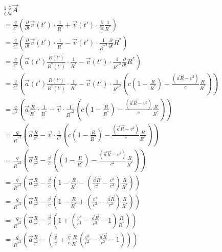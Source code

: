 \documentclass[11pt]{article}
\begin{document}
\(\begin{array}{l}\frac{1}{c}\frac{\partial }{\partial t}\overrightarrow{A} \\  = \frac{q}{c^2}\left(\frac{\partial }{\partial t}\overrightarrow{v}\left(t'\right) \cdot \frac{1}{{{R}^{*}}} + \overrightarrow{v}\left(t'\right) \cdot \frac{\partial }{\partial t}\frac{1}{{{R}^{*}}}\right) \\  = \frac{q}{c^2}\left(\frac{\partial }{\partial t}\overrightarrow{v}\left(t'\right) \cdot \frac{1}{{{R}^{*}}} - \overrightarrow{v}\left(t'\right) \cdot \frac{1}{{{R}^{*}}^2}\frac{\partial }{\partial t} {{R}^{*}}\right) \\  = \frac{q}{c^2}\left(\vec a\left(t'\right) \frac{R\left(t'\right)}{{{R}^{*}}\left(t'\right)} \cdot \frac{1}{{{R}^{*}}} - \overrightarrow{v}\left(t'\right) \cdot \frac{1}{{{R}^{*}}^2}\frac{\partial }{\partial t} {{R}^{*}}\right) \\  = \frac{q}{c^2}\left(\vec a\left(t'\right) \frac{R\left(t'\right)}{{{R}^{*}}\left(t'\right)} \cdot \frac{1}{{{R}^{*}}} - \overrightarrow{v}\left(t'\right) \cdot \frac{1}{{{R}^{*}}^2}\left( c \left(1 - \frac{R}{{{R}^{*}}}\right)-\frac{\left(\vec a \vec R - v^2 \right)}{c}\frac{R}{{{R}^{*}}} \right)\right) \\  = \frac{q}{c^2}\left(\vec a \frac{R}{{{R}^{*}}} \cdot \frac{1}{{{R}^{*}}} - \overrightarrow{v} \cdot \frac{1}{{{R}^{*}}^2}\left( c \left(1 - \frac{R}{{{R}^{*}}}\right)-\frac{\left(\vec a \vec R - v^2 \right)}{c}\frac{R}{{{R}^{*}}} \right)\right) \\  = \frac{q}{{{R}^{*}}^2}\left(\vec a \frac{R}{c^2} - \overrightarrow{v} \cdot \frac{1}{c^2}\left( c \left(1 - \frac{R}{{{R}^{*}}}\right)-\frac{\left(\vec a \vec R - v^2 \right)}{c}\frac{R}{{{R}^{*}}} \right)\right) \\  = \frac{q}{{{R}^{*}}^2}\left(\vec a \frac{R}{c^2} - \frac{\overrightarrow{v}}{c}\left( \left(1 - \frac{R}{{{R}^{*}}}\right)-\frac{\left(\vec a \vec R - v^2 \right)}{c^2}\frac{R}{{{R}^{*}}} \right)\right) \\  = \frac{q}{{{R}^{*}}^2}\left(\vec a \frac{R}{c^2} - \frac{\overrightarrow{v}}{c}\left( 1 - \frac{R}{{{R}^{*}}}-\left(\frac{\vec a \vec R}{c^2} - \frac{v^2}{c^2} \right)\frac{R}{{{R}^{*}}} \right)\right) \\  = \frac{q}{{{R}^{*}}^2}\left(\vec a \frac{R}{c^2} - \frac{\overrightarrow{v}}{c}\left( 1 - \frac{R}{{{R}^{*}}}+\left(\frac{v^2}{c^2} -\frac{\vec a \vec R}{c^2}\right)\frac{R}{{{R}^{*}}} \right)\right) \\  = \frac{q}{{{R}^{*}}^2}\left(\vec a \frac{R}{c^2} - \frac{\overrightarrow{v}}{c}\left( 1 +\left(\frac{v^2}{c^2} -\frac{\vec a \vec R}{c^2} - 1\right)\frac{R}{{{R}^{*}}} \right)\right) \\  = \frac{q}{{{R}^{*}}^2}\left(\vec a \frac{R}{c^2} - \left( \frac{\overrightarrow{v}}{c} +\frac{\overrightarrow{v}}{c}\frac{R}{{{R}^{*}}}\left(\frac{v^2}{c^2} -\frac{\vec a \vec R}{c^2} - 1\right) \right)\right) \\  \end{array}\)
\end{document}
